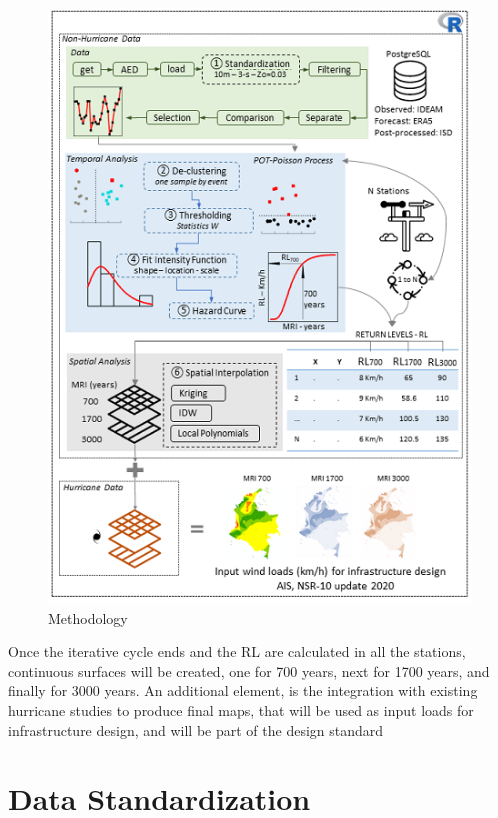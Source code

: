 \documentclass[12pt,twoside]{reedthesis}
\begin{document}
\begin{figure}

{\centering \includegraphics[width=6.26in]{figure/methodology} 

}

\caption{Methodology}\label{fig:methodology}
\end{figure}
Once the iterative cycle ends and the RL are calculated in all the stations, continuous surfaces will be created, one for 700 years, next for 1700 years, and finally for 3000 years. An additional element, is the integration with existing hurricane studies to produce final maps, that will be used as input loads for infrastructure design, and will be part of the design standard

\hypertarget{rmd-standardization}{%
\section{Data Standardization}\label{rmd-standardization}}
\end{document}
